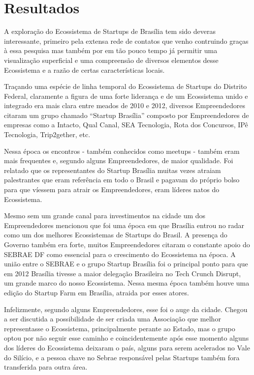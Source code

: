 \chapter[Resultados Parciais]{Resultados}
\label{cap-resultados}

A exploração do Ecossistema de Startups de Brasília tem sido deveras interessante, primeiro pela extensa rede de contatos que venho contruindo graças à essa pesquisa mas também por em tão pouco tempo já permitir uma visualização superficial e uma compreensão de diversos elementos desse Ecossistema e a razão de certas características locais.

Traçando uma espécie de linha temporal do Ecossistema de Startups do Distrito Federal, claramente a figura de uma forte liderança e de um Ecossistema unido e integrado era mais clara entre meados de 2010 e 2012, diversos Empreendedores citaram um grupo chamado ``Startup Brasília'' composto por Empreendedores de empresas como a Intacto, Qual Canal, SEA Tecnologia, Rota dos Concursos, IPê Tecnologia, Trip2gether, etc. 

Nessa época os encontros - também conhecidos como meetups - também eram mais frequentes e, segundo alguns Empreendedores, de maior qualidade. Foi relatado que os representantes do Startup Brasília muitas vezes atraiam palestrantes que eram referência em todo o Brasil e pagavam do próprio bolso para que víessem para atrair os Empreendedores, eram líderes natos do Ecossistema.

Mesmo sem um grande canal para investimentos na cidade um dos Empreendedores mencionou que foi uma época em que Brasília entrou no radar como um dos melhores Ecossistemas de Startups do Brasil. A presença do Governo também era forte, muitos Empreendedores citaram o constante apoio do SEBRAE DF como essencial para o crescimento do Ecossistema na época. A união entre o SEBRAE e o grupo Startup Brasília foi o principal ponto para que em 2012 Brasília tivesse a maior delegação Brasileira no Tech Crunch Disrupt, um grande marco do nosso Ecossistema. Nessa mesma época também houve uma edição do Startup Farm em Brasília, atraida por esses atores.

Infelizmente, segundo alguns Empreendedores, esse foi o auge da cidade. Chegou a ser discutida a possibilidade de ser criada uma Associação que melhor representasse o Ecossistema, principalmente perante ao Estado, mas o grupo optou por não seguir esse caminho e coincidentemente após esse momento alguns dos líderes do Ecossistema deixaram o país, alguns para serem acelerados no Vale do Silício, e a pessoa chave no Sebrae responsável pelas Startups também fora transferida para outra área. 

